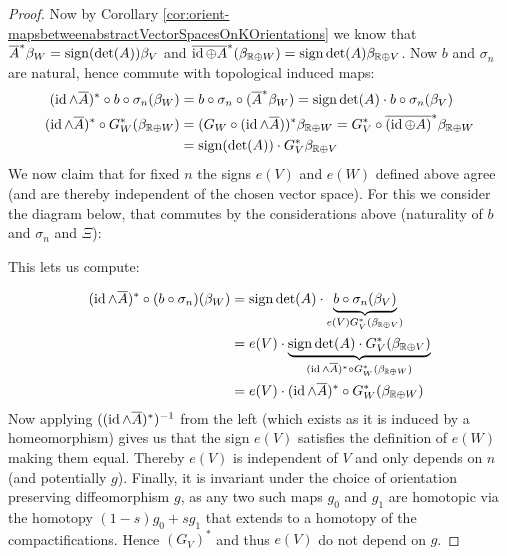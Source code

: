 \begin{proof}
	Now by Corollary \ref{cor:orient-mapsbetweenabstractVectorSpacesOnKOrientations} we know that 
	$\overline{A}^*\beta_W=\mathrm{sign}(\det(A))\beta_V$ and $\overline{\operatorname{\mathrm{id}}\oplus A}^*(\beta_{\mathbb{R}\oplus W})=\mathrm{sign}\det(A)\beta _{\mathbb{R}\oplus V}$.
	Now $b$ and $\sigma_n$ are natural, hence commute with topological induced maps:
	\begin{align*}
		(\operatorname{\mathrm{id}}\wedge \overline{A})^* \circ b\circ \sigma_n (\beta_W)
		&=b\circ \sigma_n\circ (\overline{A}^*\beta_W)=\mathrm{sign} \det(A) \cdot b\circ \sigma_n (\beta_V)\\
		(\operatorname{\mathrm{id}}\wedge \overline{A})^* \circ G_W^*(\beta_{\mathbb{R}\oplus W})
		&=(G_W\circ (\operatorname{\mathrm{id}} \wedge \overline{A}))^*\beta_{\mathbb{R}\oplus W}
		=G_V^*\circ\overline{ (\operatorname{\mathrm{id}} \oplus {A})}^*\beta_{\mathbb{R}\oplus W}\\
		&=\mathrm{sign}(\det(A))\cdot G_V^*\beta_{\mathbb{R}\oplus V}
	\end{align*}
	We now claim that for fixed $n$ the signs $e(V)$ and $e(W)$ defined above agree (and are thereby independent of the chosen vector space). For this we consider the diagram below, that commutes by the considerations above (naturality of $b$ and $\sigma_n$ and $\Xi$):
\begin{center}
	\end{center}
This lets us compute:


\begin{align*}
	(\operatorname{\mathrm{id}} \wedge \overline{A})^*\circ (b \circ \sigma_n)(\beta_W)
	&= \mathrm{sign} \det (A)\cdot \underbrace{ b\circ \sigma_n (\beta_V)}_{e(V) G_V^*(\beta_{\mathbb{R}\oplus V}) }\\
	&= e(V) \cdot \underbrace{\mathrm{sign} \det (A)\cdot G_V^*(\beta_{\mathbb{R}\oplus V}) }_{(\operatorname{\mathrm{id}}\wedge \overline{A})^* \circ G_W^*(\beta_{\mathbb{R}\oplus W})}\\
	&=e(V) \cdot (\operatorname{\mathrm{id}}\wedge \overline{A})^* \circ G_W^*(\beta_{\mathbb{R}\oplus W})
\end{align*} Now applying $((\operatorname{\mathrm{id}} \wedge \overline{A})^*)^{-1}$ from the left (which exists as it is induced by a homeomorphism) gives us that the sign $e(V)$ satisfies the definition of $e(W)$ making them equal. Thereby $e(V)$ is independent of $V$ and only depends on $n$ (and potentially $g$). Finally, it is invariant under the choice of orientation preserving diffeomorphism $g$, as any two such maps $g_0$ and $g_1$ are homotopic via the homotopy $(1-s)g_0+sg_1$ that extends to a homotopy of the compactifications. Hence $(G_V)^*$ and thus $e(V)$ do not depend on $g$.
\end{proof}


